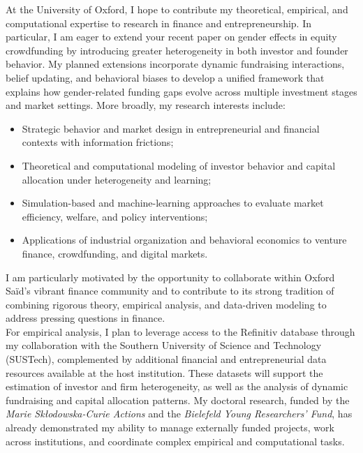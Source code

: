 \documentclass{nfr}
\begin{document}
At the University of Oxford, I hope to contribute my theoretical, empirical, and computational expertise to research in finance and entrepreneurship. 
In particular, I am eager to extend your recent paper on gender effects in equity crowdfunding \citep{hellmann2025entrepreneurial} by introducing greater heterogeneity in both investor and founder behavior. 
My planned extensions incorporate dynamic fundraising interactions, belief updating, and behavioral biases to develop a unified framework that explains how gender-related funding gaps evolve across multiple investment stages and market settings. 
More broadly, my research interests include:
\begin{itemize}
    \item Strategic behavior and market design in entrepreneurial and financial contexts with information frictions;
    \item Theoretical and computational modeling of investor behavior and capital allocation under heterogeneity and learning;
    \item Simulation-based and machine-learning approaches to evaluate market efficiency, welfare, and policy interventions;
    \item Applications of industrial organization and behavioral economics to venture finance, crowdfunding, and digital markets.
\end{itemize}
I am particularly motivated by the opportunity to collaborate within Oxford Saïd’s vibrant finance community and to contribute to its strong tradition of combining rigorous theory, empirical analysis, and data-driven modeling to address pressing questions in finance.\\

For empirical analysis, I plan to leverage access to the Refinitiv database through my collaboration with the Southern University of Science and Technology (SUSTech), complemented by additional financial and entrepreneurial data resources available at the host institution. 
These datasets will support the estimation of investor and firm heterogeneity, as well as the analysis of dynamic fundraising and capital allocation patterns. 
My doctoral research, funded by the \textit{Marie Skłodowska-Curie Actions} and the \textit{Bielefeld Young Researchers’ Fund}, has already demonstrated my ability to manage externally funded projects, work across institutions, and coordinate complex empirical and computational tasks.\\
\end{document}
